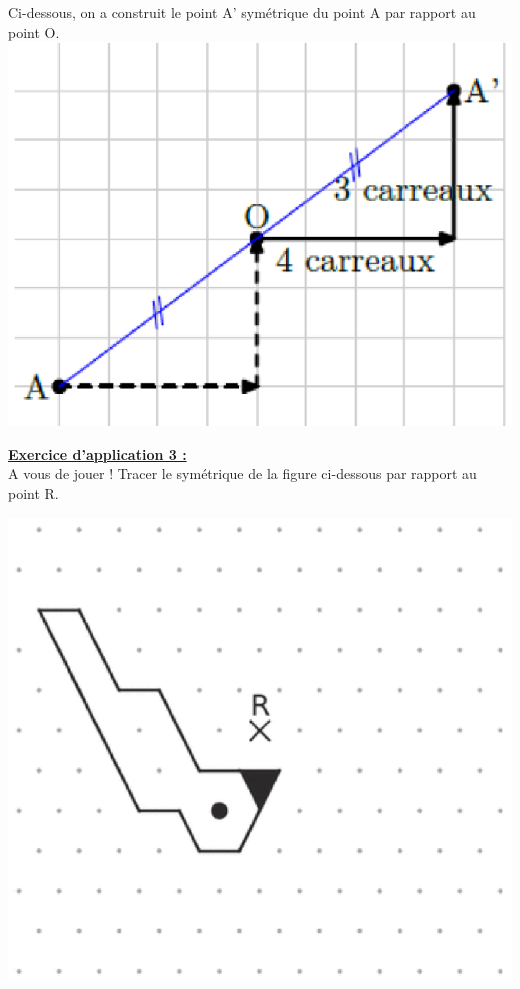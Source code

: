 \documentclass[a4paper,11pt]{article}
\begin{document}
 Ci-dessous, on a construit le point A' symétrique du point A par rapport au point O.\\
\includegraphics[scale=1]{centrale1.eps} \\


\columnbreak

\textbf{\underline{Exercice d'application 3 :}}\\
A vous de jouer ! Tracer le symétrique de la figure ci-dessous par rapport au point R.
\begin{center}
\includegraphics[scale=0.7]{centrale3.eps} 
\end{center}
\end{document}
